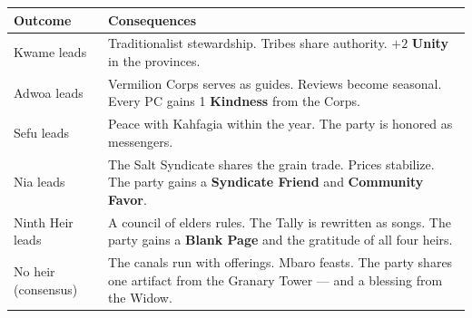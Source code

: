 \begin{tcolorbox}[colback=red!5!white,colframe=red!60!black,title={Mini-Game: The Succession Council},breakable]
\begin{longtable}{|p{}|p{}|}
\hline
\textbf{Outcome} & \textbf{Consequences} \\
\hline
Kwame leads & Traditionalist stewardship. Tribes share authority. $+2$ \textbf{Unity} in the provinces. \\
\hline
Adwoa leads & Vermilion Corps serves as guides. Reviews become seasonal. Every PC gains 1 \textbf{Kindness} from the Corps. \\
\hline
Sefu leads & Peace with Kahfagia within the year. The party is honored as messengers. \\
\hline
Nia leads & The Salt Syndicate shares the grain trade. Prices stabilize. The party gains a \textbf{Syndicate Friend} and \textbf{Community Favor}. \\
\hline
Ninth Heir leads & A council of elders rules. The Tally is rewritten as songs. The party gains a \textbf{Blank Page} and the gratitude of all four heirs. \\
\hline
No heir (consensus) & The canals run with offerings. Mbaro feasts. The party shares one artifact from the Granary Tower --- and a blessing from the Widow. \\
\hline
\end{longtable}

\end{tcolorbox}


